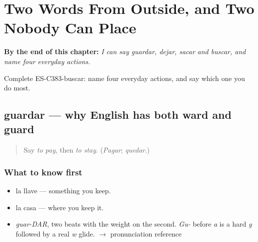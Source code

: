 
\chapter{Two Words From Outside, and Two Nobody Can Place}
\label{ch:guardar-y-dejar}

\begin{chapteropening}
\textbf{By the end of this chapter:} \emph{I can say guardar, dejar, sacar and buscar, and name four everyday actions.}

Complete ES-C383-buscar: name four everyday actions, and say which one you do most.
\end{chapteropening}

\section[guardar]{guardar — why English has both ward and guard}

\label{lesson:ES-C383-guardar}



\begin{quote}
Say \emph{to pay}, then \emph{to stay}. (\emph{Pagar}; \emph{quedar}.)
\end{quote}

\subsection*{What to know first}
\begin{itemize}
\raggedright
  \item la llave — something you keep.
  \item la casa — where you keep it.
\end{itemize}

\begin{sounds}
\begin{itemize}
\raggedright
  \item \emph{guar-DAR}, two beats with the weight on the second. \emph{Gu-} before \emph{a} is a hard \emph{g} followed by a real \emph{w} glide. $\to$ pronunciation reference
\end{itemize}
\end{sounds}

